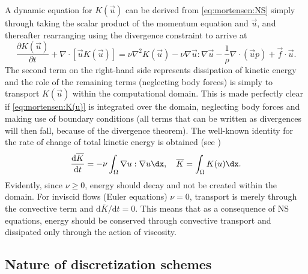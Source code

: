 A dynamic equation for $K(\vec{u})$ can be derived from
\eqref{eq:mortensen:NS} simply through taking the scalar product of the
momentum equation and $\vec{u}$, and thereafter rearranging using the
divergence constraint to arrive at
\begin{equation}
 \frac{\partial K(\vec{u})}{\partial t} + \nabla \cdot [\vec{u}K(\vec{u})]
        = \nu \nabla^2 K(\vec{u}) -\nu \nabla \vec{u} : \nabla \vec{u}
      - \frac{1}{\rho}\nabla \cdot \left(\vec{u}p \right) +\vec{f}\cdot \vec{u}.
 \label{eq:mortensen:K(u)}
\end{equation}
The second term on the right-hand side represents dissipation of kinetic
energy and the role of the remaining terms (neglecting body forces) is
simply to transport $K(\vec{u})$ within the computational domain. This
is made perfectly clear if \eqref{eq:mortensen:K(u)} is integrated over
the domain, neglecting body forces and making use of boundary conditions
(all terms that can be written as divergences will then fall, because of
the divergence theorem). The well-known identity for the rate of change
of total kinetic energy is obtained (see \citet{SimoArmero1994})
\begin{equation}
 \frac{\text{d} \overline{K} }{\text{d} t} = - \nu \int_\Omega \nabla
 \vec{u} : \nabla \vec{u} \dx,
\quad \overline{K} = \int_{\Omega} K(\vec{u}) \dx .
\end{equation}
Evidently, since $\nu \ge 0$, energy should decay and not be created
within the domain. For inviscid flows (Euler equations) $\nu=0$, transport
is merely through the convective term and $\text{d} \overline{K}/\text{d}
t = 0$. This means that as a consequence of NS equations, energy should
be conserved through convective transport and dissipated only through
the action of viscosity.


\subsection{Nature of discretization schemes}
\label{sec:mortensen:dissipative:dispersive}

